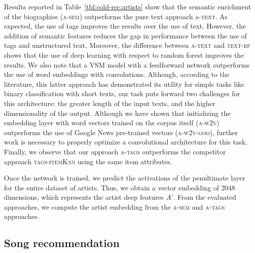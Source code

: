 Results reported in Table~\ref{tbl:cold-rec:artists} show that the semantic enrichment of the biographies (\textsc{a-sem}) outperforms the pure text approach \textsc{a-text}. As expected, the use of tags improves the results over the use of text. However, the addition of semantic features reduces the gap in performance between the use of tags and unstructured text. Moreover, the difference between \textsc{a-text} and \textsc{text-rf} shows that the use of deep learning with respect to random forest improves the results. We also note that a VSM model with a feedforward network outperforms the use of word embeddings with convolutions. Although, according to the literature, this latter approach has demonstrated its utility for simple tasks like binary classification with short texts, our task puts forward two challenges for this architecture: the greater length of the input texts, and the higher dimensionality of the output. Although we have shown that initializing the embedding layer with word vectors trained on the corpus itself (\textsc{a-w2v}) outperforms the use of Google News pre-trained vectors (\textsc{a-w2v-goo}), further work is necessary to properly optimize a convolutional architecture for this task. Finally, we observe that our approach \textsc{a-tags} outperforms the competitor approach \textsc{tags-itemKnn} using the same item attributes.

Once the network is trained, we predict the activations of the penultimate layer for the entire dataset of artists. Thus, we obtain a vector embedding of 2048 dimensions, which represents the artist deep features $A'$. From the evaluated approaches, we compute the artist embedding from the \textsc{a-sem} and \textsc{a-tags} approaches.

\subsection{Song recommendation}
\label{sec:cold-rec:song-rec}


